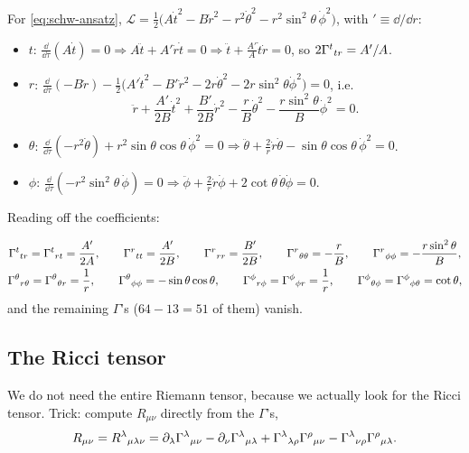 For \eqref{eq:schw-ansatz}, $\mathcal L=\frac12\big(A\dot t^2-B\dot r^2-r^2\dot\theta^2-r^2\sin^2\theta\,\dot\phi^2\big)$, with $'\equiv\dd/\dd r$:
\begin{itemize}
\item $t$: $\frac{\dd}{\dd\tau}(A\dot t)=0\Rightarrow A\ddot t+A'\dot r\dot t=0\Rightarrow\ddot t+\frac{A'}{A}\dot t\dot r=0$, so $2\Gamma^{t}{}_{tr}=A'/A$.
\item $r$: $\frac{\dd}{\dd\tau}(-B\dot r)-\frac12\big(A'\dot t^2-B'\dot r^2-2r\dot\theta^2-2r\sin^2\theta\dot\phi^2\big)=0$, i.e.
\[
  \ddot r+\frac{A'}{2B}\dot t^2+\frac{B'}{2B}\dot r^2-\frac rB\dot\theta^2-\frac{r\sin^2\theta}{B}\dot\phi^2=0 .
\]
\item $\theta$: $\frac{\dd}{\dd\tau}(-r^2\dot\theta)+r^2\sin\theta\cos\theta\,\dot\phi^2=0\Rightarrow\ddot\theta+\frac2r\dot r\dot\theta-\sin\theta\cos\theta\,\dot\phi^2=0$.
\item $\phi$: $\frac{\dd}{\dd\tau}(-r^2\sin^2\theta\,\dot\phi)=0\Rightarrow\ddot\phi+\frac2r\dot r\dot\phi+2\cot\theta\,\dot\theta\dot\phi=0$.
\end{itemize}
Reading off the coefficients:
\begin{keyresult}
\begin{gather*}
  \Gamma^{t}{}_{tr}=\Gamma^{t}{}_{rt}=\frac{A'}{2A},\qquad
  \Gamma^{r}{}_{tt}=\frac{A'}{2B},\qquad\Gamma^{r}{}_{rr}=\frac{B'}{2B},\qquad\Gamma^{r}{}_{\theta\theta}=-\frac rB,\qquad\Gamma^{r}{}_{\phi\phi}=-\frac{r\sin^2\theta}{B},\\
  \Gamma^{\theta}{}_{r\theta}=\Gamma^{\theta}{}_{\theta r}=\frac1r,\qquad\Gamma^{\theta}{}_{\phi\phi}=-\sin\theta\cos\theta,\qquad
  \Gamma^{\phi}{}_{r\phi}=\Gamma^{\phi}{}_{\phi r}=\frac1r,\qquad\Gamma^{\phi}{}_{\theta\phi}=\Gamma^{\phi}{}_{\phi\theta}=\cot\theta,
\end{gather*}
and the remaining $\Gamma$'s ($64-13=51$ of them) vanish.
\end{keyresult}

\subsection{The Ricci tensor}
We do not need the entire Riemann tensor, because we actually look for the Ricci tensor. Trick: compute $R_{\mu\nu}$ directly from the $\Gamma$'s,
\begin{equation}
  R_{\mu\nu}=R^{\lambda}{}_{\mu\lambda\nu}=\partial_\lambda\Gamma^{\lambda}{}_{\mu\nu}-\partial_\nu\Gamma^{\lambda}{}_{\mu\lambda}+\Gamma^{\lambda}{}_{\lambda\rho}\Gamma^{\rho}{}_{\mu\nu}-\Gamma^{\lambda}{}_{\nu\rho}\Gamma^{\rho}{}_{\mu\lambda}.
  \label{eq:ricci-from-gamma}
\end{equation}

